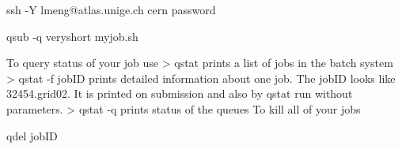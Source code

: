 ssh -Y lmeng@atlas.unige.ch
cern password

qsub -q veryshort myjob.sh

To query status of your job use
> qstat 
prints a list of jobs in the batch system
> qstat -f jobID 
prints detailed information about one job. The jobID looks like 32454.grid02. It is printed on submission and also by qstat run without parameters.
> qstat -q 
prints status of the queues
To kill all of your jobs

qdel jobID